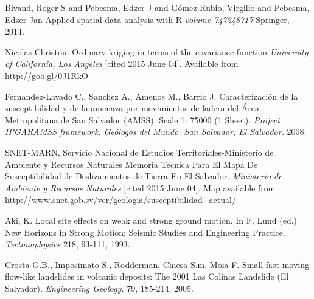 \documentclass[11pt,twoside]{rmta2010esp}%
\begin{document}
\begin{thebibliography}{99}
Bivand, Roger S and Pebesma, Edzer J and G{\'o}mez-Rubio, Virgilio and Pebesma, Edzer Jan
\newblock Applied spatial data analysis with R
\newblock \emph{volume 747248717}
 Springer, 2014.



Nicolas Christou.
\newblock Ordinary kriging in terms of the covariance function
\newblock \emph{University of California, Los Angeles}
 [cited 2015 June 04]. Available from http://goo.gl/0J1RkO



Fernandez-Lavado C., Sanchez A., Amenos M., Barrio J.
\newblock Caracterizaci\'{o}n de la susceptibilidad y de la amenaza por movimientos de ladera del \'{A}rea Metropolitana de San Salvador (AMSS). Scale 1: 75000 (1 Sheet).
\newblock \emph{Project IPGARAMSS framework. Ge\'{o}logos del Mundo. San Salvador, El Salvador.}
 2008.




SNET-MARN, Servicio Nacional de Estudios Territoriales-Ministerio de Ambiente y Recursos Naturales
\newblock Memoria T\'{e}cnica Para El Mapa De Susceptibilidad de Deslizamientos de Tierra En El Salvador.
\newblock \emph{Ministerio de Ambiente y Recursos Naturales}
 [cited 2015 June 04]. Map available from http://www.snet.gob.sv/ver/geologia/susceptibilidad+actual/


Aki, K. 
\newblock Local site effects on weak and strong ground motion. In F. Lund (ed.) New Horizons in Strong Motion: Seismic Studies and Engineering Practice.
\newblock \emph{Tectonophysics}
 218, 93-111, 1993.   


Crosta G.B., Imposimato S., Rodderman, Chiesa S.m, Moia F. 
\newblock Small fast-moving flow-like landslides in volcanic deposits: The 2001 Las Colinas Landslide (El Salvador). 
\newblock \emph{Engineering Geology.}
 79, 185-214, 2005.




\end{thebibliography}
\end{document}
